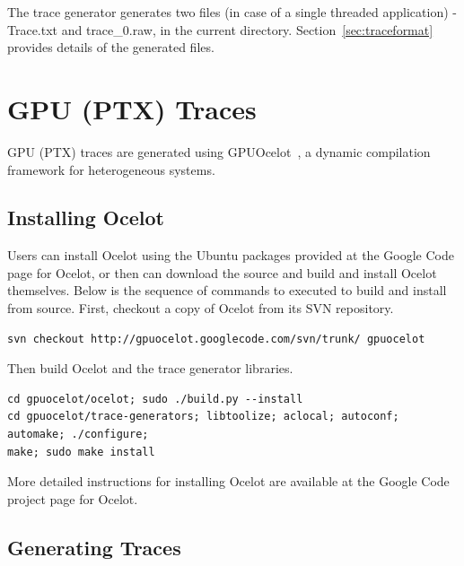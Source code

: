 The trace generator generates two files (in case of a single threaded
    application) - Trace.txt and trace\_0.raw, in the current directory.
Section~\ref{sec:traceformat} provides details of the generated files.



\section{GPU (PTX) Traces}
\label{sec:gpu_traces}

GPU (PTX) traces are generated using GPUOcelot~\cite{ocelot}, a dynamic compilation
framework for heterogeneous systems. 


\subsection{Installing Ocelot}

Users can install Ocelot using the Ubuntu packages provided at the Google Code
page for Ocelot, or then can download the source and build and install Ocelot
themselves. Below is the sequence of commands to executed to build and install
from source. First, checkout a copy of Ocelot from its SVN repository.

\begin{Verbatim}
svn checkout http://gpuocelot.googlecode.com/svn/trunk/ gpuocelot
\end{Verbatim}


Then build Ocelot and the trace generator libraries.

\begin{Verbatim}
cd gpuocelot/ocelot; sudo ./build.py --install
cd gpuocelot/trace-generators; libtoolize; aclocal; autoconf; automake; ./configure; 
make; sudo make install
\end{Verbatim}


More detailed instructions for installing Ocelot are available at the Google
Code project page for Ocelot.


\subsection{Generating Traces}

